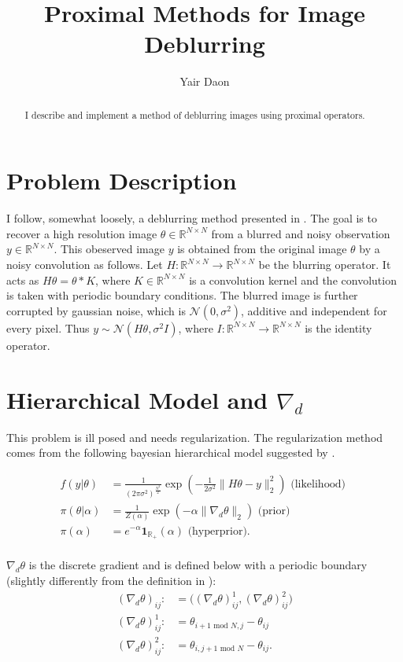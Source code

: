 \documentclass[paper=a4, fontsize=11pt]{scrartcl} %
\title{Proximal Methods for Image Deblurring}
\author{Yair Daon}
\date{}
\numberwithin{equation}{section} %
\numberwithin{figure}{section} %
\numberwithin{table}{section} %
\newcommand{\grad}{\nabla_{d} }
\newcommand{\modd}{\text{ mod }}
\begin{document}
\maketitle
\begin{abstract}
  I describe and implement a method of deblurring images using
  proximal operators.
\end{abstract}

\section{Problem Description}
I follow, somewhat loosely, a deblurring method presented in
\cite{green2015bayesian}. The goal is to recover a high resolution
image $\theta \in \mathbb{R}^{N \times N}$ from a blurred and noisy
observation $y \in \mathbb{R}^{N \times N}$. This obeserved image $y$
is obtained from the original image $\theta$ by a noisy convolution as
follows. Let $H: \mathbb{R}^{N \times N} \to \mathbb{R}^{N \times N}$
be the blurring operator. It acts as $H\theta = \theta * K$, where $K
\in \mathbb{R}^{N \times N}$ is a convolution kernel and the
convolution is taken with periodic boundary conditions.  The blurred
image is further corrupted by gaussian noise, which is $\mathcal{N}(0,
\sigma^2)$, additive and independent for every pixel. Thus $y \sim
\mathcal{N}( H\theta, \sigma^2I)$, where $I: \mathbb{R}^{N \times N}
\to \mathbb{R}^{N \times N}$ is the identity operator.

\section{Hierarchical Model and $\grad$}
This problem is ill posed and needs regularization. The regularization
method comes from the following bayesian hierarchical model suggested
by \cite{oliveira2009adaptive}.

\begin{align*}
  f(y | \theta) &= \frac{1}{ (2\pi \sigma^2)^{\frac{N^2}{2}}} \exp( -\frac{1}{2\sigma^2}\|H\theta - y\|_2^2 )
 \text{ (likelihood) }\\
  \pi( \theta | \alpha ) &= \frac{1}{Z(\alpha)} \exp( -\alpha \|\grad\theta\|_2 ) \text{ (prior) }\\
  \pi(\alpha) &= e^{-\alpha} \mathbf{1}_{\mathbb{R}_{+}}(\alpha) \text{ (hyperprior)}. \\
\end{align*} 

$\grad \theta$ is the discrete gradient and is defined below with a
periodic boundary (slightly differently from the definition in
\cite{chambolle2004algorithm}):
\begin{align*}
  (\grad \theta)_{ij} :&= \big ( (\grad \theta)_{ij}^1 , ( \grad
  \theta)_{ij}^2 \big ) \\
  (\grad \theta)_{ij}^1 :&= \theta_{i+1\modd N,j} -\theta_{ij} \\
  (\grad\theta)_{ij}^2 :&= \theta_{i,j+1\modd N}
  -\theta_{ij}.
\end{align*}
\end{document}
